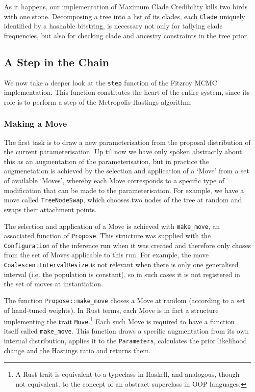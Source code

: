 \documentclass[10pt,journal,compsoc]{IEEEtran}
\begin{document}
As it happens, our implementation of Maximum Clade Credibility kills two birds with one stone. Decomposing a tree into a list of its clades, each \texttt{Clade} uniquely identified by a hashable bitstring, is necessary not only for tallying clade frequencies, but also for checking clade and ancestry constraints in the tree prior.

\subsection{A Step in the Chain}

We now take a deeper look at the \texttt{step} function of the Fitzroy MCMC implementation. This function constitutes the heart of the entire system, since its role is to perform a step of the Metropolis-Hastings algorithm.

\subsubsection{Making a Move}

The first task is to draw a new parameterisation from the proposal distribution of the current parameterisation. Up til now we have only spoken abstractly about this as an augmentation of the parameterisation, but in practice the augmenetation is achieved by the selection and application of a `Move' from a set of available `Moves', whereby each Move corresponds to a specific type of modification that can be made to the parameterisation. For example, we have a move called \texttt{TreeNodeSwap}, which chooses two nodes of the tree at random and swaps their attachment points.

The selection and application of a Move is achieved with \texttt{make\_move}, an associated function of \texttt{Propose}. This structure was supplied with the \texttt{Configuration} of the inference run when it was created and therefore only choses from the set of Moves applicable to this run. For example, the move \texttt{CoalescentIntervalResize} is not relevant when there is only one generalised interval (i.e. the population is constant), so in such cases it is not registered in the set of moves at instantiation.

The function \texttt{Propose::make\_move} choses a Move at random (according to a set of hand-tuned weights). In Rust terms, each Move is in fact a structure implementing the trait \texttt{Move}.\footnote{A Rust trait is equivalent to a typeclass in Haskell, and analogous, though not equivalent, to the concept of an abstract superclass in OOP languages.} Each such Move is required to have a function itself called \texttt{make\_move}. This function draws a specific augmentation from its own internal distribution, applies it to the \texttt{Parameters}, calculates the prior likelihood change and the Hastings ratio and returns them.
\end{document}
